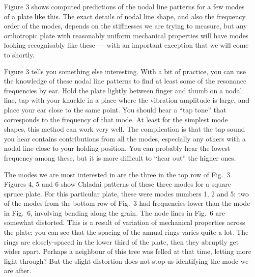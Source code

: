 
  Figure 3 shows computed predictions of the nodal line patterns for a few 
  modes of a plate like this. The exact details of nodal line shape, and also 
  the frequency order of the modes, depends on the stiffnesses we are trying to 
  measure, but any orthotropic plate with reasonably uniform mechanical 
  properties will have modes looking recognisably like these — with an 
  important exception that we will come to shortly. 


  Figure 3 tells you something else interesting. With a bit of practice, you 
  can use the knowledge of these nodal line patterns to find at least some of 
  the resonance frequencies by ear. Hold the plate lightly between finger and 
  thumb on a nodal line, tap with your knuckle in a place where the vibration 
  amplitude is large, and place your ear close to the same point. You should 
  hear a “tap tone” that corresponds to the frequency of that mode. At least 
  for the simplest mode shapes, this method can work very well. The 
  complication is that the tap sound you hear contains contributions from all 
  the modes, especially any others with a nodal line close to your holding 
  position. You can probably hear the lowest frequency among these, but it is 
  more difficult to “hear out” the higher ones. 

  The modes we are most interested in are the three in the top row of Fig.\ 3. 
  Figures 4, 5 and 6 show Chladni patterns of these three modes for a square 
  spruce plate. For this particular plate, these were modes numbers 1, 2 and 5: 
  two of the modes from the bottom row of Fig.\ 3 had frequencies lower than 
  the mode in Fig.\ 6, involving bending along the grain. The node lines in 
  Fig.\ 6 are somewhat distorted. This is a result of variation of mechanical 
  properties across the plate: you can see that the spacing of the annual rings 
  varies quite a lot. The rings are closely-spaced in the lower third of the 
  plate, then they abruptly get wider apart. Perhaps a neighbour of this tree 
  was felled at that time, letting more light through? But the slight 
  distortion does not stop us identifying the mode we are after. 

